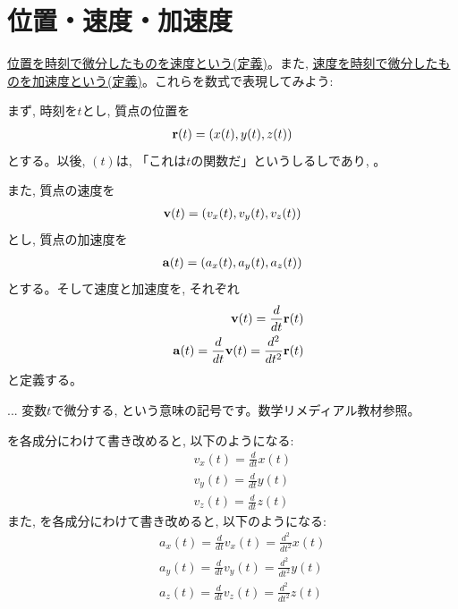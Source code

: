 \section{位置・速度・加速度}

\underline{位置を時刻で微分したものを速度という(定義)}。また, 
\underline{速度を時刻で微分したものを加速度という(定義)}。これらを数式で表現してみよう:

まず, 時刻を$t$とし, 質点の位置を
\begin{eqnarray}
{\bf r}(t)=(x(t), y(t), z(t))
\end{eqnarray}
とする。以後, $(t)$は, 「これは$t$の関数だ」というしるしであり, 。

また, 質点の速度を
\begin{eqnarray}
{\bf v}(t)=(v_x(t), v_y(t), v_z(t))
\end{eqnarray}
とし, 質点の加速度を
\begin{eqnarray}
{\bf a}(t)=(a_x(t), a_y(t), a_z(t))
\end{eqnarray}
とする。そして速度と加速度を, それぞれ
\begin{eqnarray}
&&{\bf v}(t)=\frac{d}{dt}{\bf r}(t)\label{eq:v_drdt}\\
&&{\bf a}(t)=\frac{d}{dt}{\bf v}(t)=\frac{d^2}{dt^2}{\bf r}(t)\label{eq:a_dvdt}
\end{eqnarray}
と定義する。

\begin{faq}{\small{}
 ... 変数$t$で微分する, という意味の記号です。数学リメディアル教材参照。}\end{faq}

を各成分にわけて書き改めると, 以下のようになる:
\begin{eqnarray}
&&v_x(t)=\frac{d}{dt}x(t)\label{eq:def_vx_dxdt}\\
&&v_y(t)=\frac{d}{dt}y(t)\label{eq:def_vy_dydt}\\
&&v_z(t)=\frac{d}{dt}z(t)\label{eq:def_vz_dzdt}
\end{eqnarray}
また, を各成分にわけて書き改めると, 以下のようになる:
\begin{eqnarray}
&&a_x(t)=\frac{d}{dt}v_x(t)=\frac{d^2}{dt^2}x(t)\label{eq:def_ax_dvdt}\\
&&a_y(t)=\frac{d}{dt}v_y(t)=\frac{d^2}{dt^2}y(t)\\
&&a_z(t)=\frac{d}{dt}v_z(t)=\frac{d^2}{dt^2}z(t)
\end{eqnarray}

